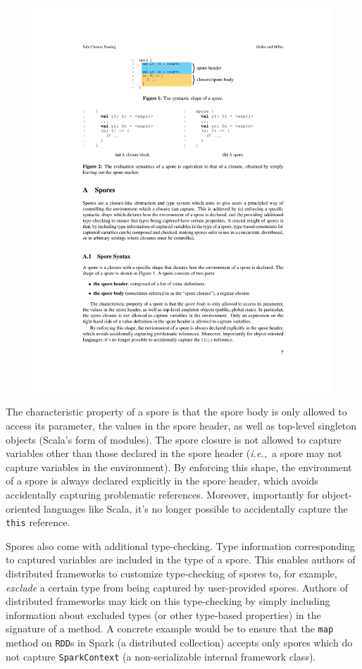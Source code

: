 \documentclass[preprint]{sigplanconf}
\theoremstyle{definition}
\theoremstyle{definition}
\newcommand{\ie}{{\em i.e.,~}}
\begin{document}
\vspace{-1mm}
\begin{figure}[h!]
\centering\includegraphics[width=0.75\columnwidth]{spore-shape.pdf}
\end{figure}
\vspace{-1mm}

The characteristic property of a spore is that the spore body is only allowed
to access its parameter, the values in the spore header, as well as top-level
singleton objects (Scala's form of modules). The spore closure is not allowed
to capture variables other than those declared in the spore header (\ie a
spore may not capture variables in the environment). By enforcing this shape,
the environment of a spore is always declared explicitly in the spore header,
which avoids accidentally capturing problematic references. Moreover,
importantly for object-oriented languages like Scala, it's no longer possible
to accidentally capture the \verb|this| reference.

Spores also come with additional type-checking. Type information corresponding
to captured variables are included in the type of a spore. This enables
authors of distributed frameworks to customize type-checking of spores to, for
example, {\em exclude} a certain type from being captured by user-provided
spores. Authors of distributed frameworks may kick on this type-checking by
simply including information about excluded types (or other type-based
properties) in the signature of a method. A concrete example would be to
ensure that the \verb|map| method on \verb|RDD|s in Spark (a distributed
collection) accepts only spores which do not capture \verb|SparkContext| (a
non-serializable internal framework class).
\end{document}
